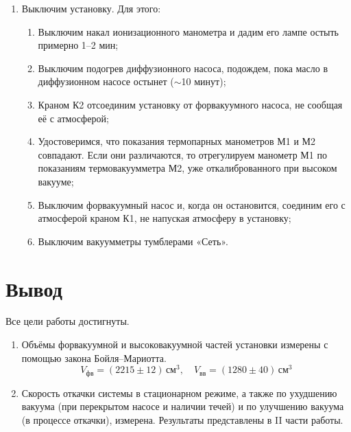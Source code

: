\documentclass[a4paper,12pt]{article} %
\begin{document}
\begin{enumerate}
    \item Выключим установку. Для этого:
    \begin{enumerate}
        \item Выключим накал ионизационного манометра и дадим его лампе остыть примерно 1–2 мин;
        \item Выключим подогрев диффузионного насоса, подождем, пока масло в диффузионном насосе остынет ($\sim$10 минут);
        \item Краном К2 отсоединим установку от форвакуумного насоса, не сообщая её с атмосферой;
        \item Удостоверимся, что показания термопарных манометров М1 и М2 совпадают. Если они различаются, то отрегулируем манометр М1 по показаниям термовакуумметра М2, уже откалиброванного при высоком вакууме;
        \item Выключим форвакуумный насос и, когда он остановится, соединим его с атмосферой краном К1, не напуская атмосферу в установку;
        \item Выключим вакуумметры тумблерами «Сеть».
    \end{enumerate}
\end{enumerate}

\section*{Вывод}

Все цели работы достигнуты.

\begin{enumerate}
  \item Объёмы форвакуумной и высоковакуумной частей установки измерены с помощью закона Бойля–Мариотта.
  \begin{equation}
    V_{\text{фв}} = (2215 \pm 12) \, \text{см}^3, \quad V_{\text{вв}} = (1280 \pm 40) \, \text{см}^3
  \end{equation}
  \item Скорость откачки системы в стационарном режиме, а также по ухудшению вакуума (при перекрытом насосе и наличии течей) и по улучшению вакуума (в процессе откачки), измерена. Результаты представлены в II части работы.
  
	\hfill \break
\end{enumerate}
\end{document}

